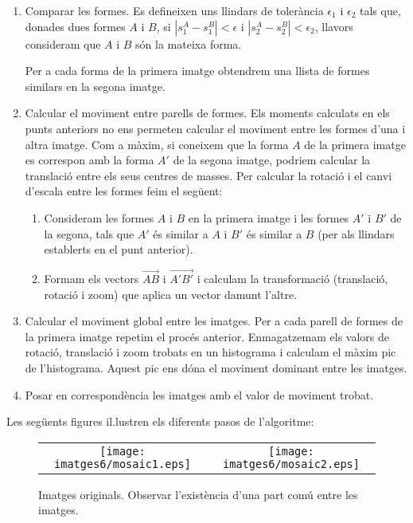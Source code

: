 \documentclass{article}
\begin{document}
\begin{enumerate}
\item Comparar les formes. Es defineixen uns llindars de toler\`ancia $\epsilon_1$ i $\epsilon_2$ tals que,
donades dues formes $A$ i $B$, si $|s_1^A-s_1^B| < \epsilon$ i $|s_2^A-s_2^B| < \epsilon_2$, llavors
consideram que $A$ i $B$ s\'on la mateixa forma. 

Per a cada forma de la primera imatge obtendrem una llista de formes similars en la segona imatge.


\item Calcular el moviment entre parells de formes. Els moments calculats en els punts anteriors no ens permeten
calcular el moviment entre les formes d'una i altra imatge. Com a m\`axim, si coneixem que la forma $A$ de la primera
imatge es correspon amb la forma $A'$ de la segona imatge, podriem calcular la translaci\'o entre els seus centres 
de masses. Per calcular la rotaci\'o i el canvi d'escala entre les formes feim el seg\"uent:

\begin{enumerate}
\item Consideram les formes $A$ i $B$ en la primera imatge i les formes $A'$ i $B'$ de la segona, tals que
$A'$ \'es similar a $A$ i $B'$ \'es similar a $B$ (per als llindars establerts en el punt anterior).
\item Formam els vectors $\vec{AB}$ i $\vec{A'B'}$ i calculam la transformaci\'o (translaci\'o, rotaci\'o i zoom)
que aplica un vector damunt l'altre.
\end{enumerate}

\item Calcular el moviment global entre les imatges. Per a cada parell de formes de la primera imatge repetim el
proc\'es anterior. Enmagatzemam els valors de rotaci\'o, translaci\'o i zoom trobats en un histograma i
calculam el m\`axim pic de l'histograma. Aquest pic ens d\'ona el moviment dominant entre les imatges.


\item Posar en correspond\`encia les imatges amb el valor de moviment trobat.

\end{enumerate}


Les seg\"uents figures il.lustren els diferents pasos de l'algoritme:

\begin{figure}[htbp]
\begin{center}
\begin{tabular}{cc}
\texttt{[image: imatges6/mosaic1.eps]} &
\texttt{[image: imatges6/mosaic2.eps]}
\end{tabular}
\end{center}
\caption{Imatges originals. Observar l'exist\`encia d'una part com\'u entre les imatges.}
\end{figure}
\end{document}
